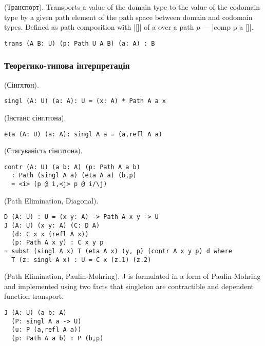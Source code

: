 \begin{theorem} (Транспорт).
Transports a value of the domain type to the value of the codomain type
by a given path element of the path space between domain and codomain types.
Defined as path composition with |[]| of a over a path $p$ --- |comp p a []|.
\begin{lstlisting}
trans (A B: U) (p: Path U A B) (a: A) : B
\end{lstlisting}
\end{theorem}

\newpage
\subsubsection{Теоретико-типова інтерпретація}

\begin{definition} (Сінглтон).
\begin{lstlisting}
singl (A: U) (a: A): U = (x: A) * Path A a x
\end{lstlisting}
\end{definition}

\begin{theorem} (Інстанс сінглтона).
\begin{lstlisting}
eta (A: U) (a: A): singl A a = (a,refl A a)
\end{lstlisting}
\end{theorem}

\begin{theorem} (Стягуваність сінглтона).
\begin{lstlisting}
contr (A: U) (a b: A) (p: Path A a b)
  : Path (singl A a) (eta A a) (b,p)
  = <i> (p @ i,<j> p @ i/\j)
\end{lstlisting}
\end{theorem}

\begin{theorem} (Path Elimination, Diagonal).
\begin{lstlisting}
D (A: U) : U = (x y: A) -> Path A x y -> U
J (A: U) (x y: A) (C: D A)
  (d: C x x (refl A x))
  (p: Path A x y) : C x y p
= subst (singl A x) T (eta A x) (y, p) (contr A x y p) d where
  T (z: singl A x) : U = C x (z.1) (z.2)
\end{lstlisting}
\end{theorem}

\begin{theorem} (Path Elimination, Paulin-Mohring).
J is formulated in a form of Paulin-Mohring and implemented using
two facts that singleton are contractible and dependent function
transport.
\begin{lstlisting}
J (A: U) (a b: A)
  (P: singl A a -> U)
  (u: P (a,refl A a))
  (p: Path A a b) : P (b,p)
\end{lstlisting}
\end{theorem}

